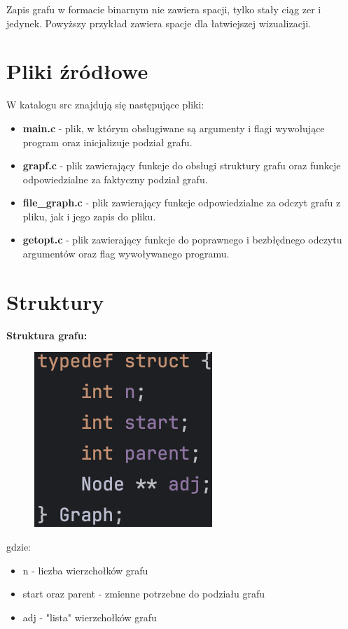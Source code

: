 \documentclass{article}
\begin{document}
Zapis grafu w formacie binarnym nie zawiera spacji, tylko stały ciąg zer i jedynek. Powyższy przykład zawiera spacje dla łatwiejszej wizualizacji.

\section*{Pliki źródłowe}
W katalogu src znajdują się następujące pliki:
\begin{itemize}
    \item \textbf{main.c} - plik, w którym obsługiwane są argumenty i flagi wywołujące program oraz inicjalizuje podział grafu.

    \item \textbf{grapf.c} - plik zawierający funkcje do obsługi struktury grafu oraz funkcje odpowiedzialne za faktyczny podział grafu.

    \item \textbf{file\_graph.c} - plik zawierający funkcje odpowiedzialne za odczyt grafu z pliku, jak i jego zapis do pliku.

    \item \textbf{getopt.c} - plik zawierający funkcje do poprawnego i bezbłędnego odczytu argumentów oraz flag wywoływanego programu.
    
\end{itemize}

\section*{Struktury}
\textbf{Struktura grafu:}\\

\begin{figure}[ht]
  \includegraphics[]{img/graph.png}
\end{figure}
gdzie:
\begin{itemize}
    \item n - liczba wierzchołków grafu
    \item start oraz parent - zmienne potrzebne do podziału grafu
    \item adj - "lista" wierzchołków grafu
\end{itemize}
\end{document}
